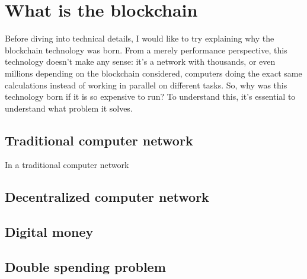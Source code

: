 
\section{What is the blockchain}

Before diving into technical details, I would like to try explaining why the blockchain technology was born. From a merely performance perspective, this technology doesn't make any sense: it's a network with thousands, or even millions depending on the blockchain considered, computers doing the exact same calculations instead of working in parallel on different tasks. So, why was this technology born if it is so expensive to run? To understand this, it's essential to understand what problem it solves.

\subsection{Traditional computer network}

In a traditional computer network

\subsection{Decentralized computer network}

\subsection{Digital money}

\subsection{Double spending problem}

